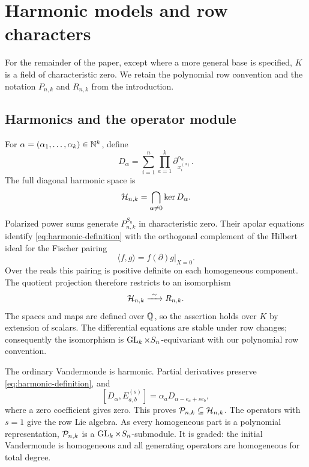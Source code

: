 \section{Harmonic models and row characters}
\label{sec:preliminaries}

For the remainder of the paper, except where a more general base is
specified, $K$ is a field of characteristic zero.  We retain the
polynomial row convention and the notation $P_{n,k}$ and $R_{n,k}$
from the introduction.

\subsection{Harmonics and the operator module}

For $\alpha=(\alpha_1,\ldots,\alpha_k)\in\mathbb N^k$, define
\[
 D_\alpha=\sum_{i=1}^n
       \prod_{a=1}^k\partial_{x_i^{(a)}}^{\alpha_a}.
\]
The full diagonal harmonic space is
\begin{equation}\label{eq:harmonic-definition}
 \mathcal H_{n,k}=\bigcap_{\alpha\ne0}\ker D_\alpha.
\end{equation}
Polarized power sums generate $P_{n,k}^{S_n}$ in characteristic
zero.  Their apolar equations identify
\eqref{eq:harmonic-definition} with the orthogonal complement of
the Hilbert ideal for the Fischer pairing
\[
 \langle f,g\rangle=f(\partial)g\big|_{X=0}.
\]
Over the reals this pairing is positive definite on each
homogeneous component.  The quotient projection therefore
restricts to an isomorphism
\begin{equation}\label{eq:harmonic-quotient}
 \mathcal H_{n,k}\xrightarrow{\ \sim\ }R_{n,k}.
\end{equation}
The spaces and maps are defined over $\mathbb Q$, so the assertion
holds over $K$ by extension of scalars.  The differential
equations are stable under row changes; consequently the
isomorphism is $\operatorname{GL}_k\times S_n$-equivariant with our
polynomial row convention.

The ordinary Vandermonde is harmonic.  Partial derivatives
preserve \eqref{eq:harmonic-definition}, and
\begin{equation}\label{eq:polarization-commutator}
 [D_\alpha,E_{a,b}^{(s)}]
       =\alpha_a D_{\alpha-e_a+s e_b},
\end{equation}
where a zero coefficient gives zero.  This proves
$\mathcal P_{n,k}\subseteq\mathcal H_{n,k}$.
The operators with $s=1$ give the row Lie algebra.  As every
homogeneous part is a polynomial representation, $\mathcal P_{n,k}$
is a $\operatorname{GL}_k\times S_n$-submodule.  It is graded: the initial
Vandermonde is homogeneous and all generating operators are
homogeneous for total degree.

